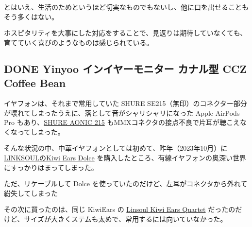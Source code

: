 \documentclass[11pt]{article}
\begin{document}
とはいえ、生活のためというほど切実なものでもないし、他に口を出せることもそう多くはない。

ホスピタリティを大事にした対応をすることで、見返りは期待していなくても、育てていく喜びのようなものは感じられている。
\subsection{{\bfseries\sffamily DONE} Yinyoo インイヤーモニター カナル型 CCZ Coffee Bean}
\label{sec:org388a10c}
イヤフォンは、それまで常用していた SHURE SE215（無印）のコネクター部分が壊れてしまったうえに、落として音がシャリシャリになった Apple AirPods Pro もあり、\href{https://www.amazon.co.jp/dp/B09CZHN9VF/ref=sspa\_dk\_detail\_0?pd\_rd\_i=B09CZHN9VF\&pd\_rd\_w=rUZbI\&content-id=amzn1.sym.f293be60-50b7-49bc-95e8-931faf86ed1e\&pf\_rd\_p=f293be60-50b7-49bc-95e8-931faf86ed1e\&pf\_rd\_r=J7R8B10MRFQNY5X13CEZ\&pd\_rd\_wg=mIVsH\&pd\_rd\_r=89b7d26a-db8f-4b66-9e1d-d0d1e9643baf\&s=musical-instruments\&sp\_csd=d2lkZ2V0TmFtZT1zcF9kZXRhaWw\&th=1}{SHURE AONIC 215} もMMXコネクタの接点不良で片耳が聴こえなくなってしまった。

そんな状況の中、中華イヤフォンとしては初めて、昨年（2023年10月）に\href{https://www.amazon.co.jp/1DDダイナミック型HiFiイヤホン-リケーブル可能のデザイン-0-78mm2pinコネクタの採用-バランスな音質表現を持ちハイエンドイヤホン-ミキシング用の中華製イヤホン/dp/B0C39PK494?pd\_rd\_w=BuYlF\&content-id=amzn1.sym.a8cbdd54-57d2-48f2-94b3-7515d6146573\&pf\_rd\_p=a8cbdd54-57d2-48f2-94b3-7515d6146573\&pf\_rd\_r=GH16TVWVRCJ4GN9KA0JJ\&pd\_rd\_wg=rGYXP\&pd\_rd\_r=38b3f7a9-4f01-4a75-86d8-395986f247d3\&pd\_rd\_i=B0C39PK494\&psc=1\&ref\_=pd\_bap\_d\_grid\_rp\_0\_16\_i}{LINKSOULのKiwi Ears Dolce} を購入したところ、有線イヤフォンの奥深い世界にすっかりはまってしまった。

ただ、リケーブルして Dolce を使っていたのだけど、左耳がコネクタから外れて紛失してしまった🥲

その次に買ったのは、同じ KiwiEars の \href{https://www.amazon.co.jp/Linsoul-リケーブル可能のデザイン-0-78mm2pinコネクタの採用-バランスな音質表現を持ちハイエンドイヤホン-ミキシング用の中華製イヤホン/dp/B0C48QLNSQ?pd\_rd\_w=BuYlF\&content-id=amzn1.sym.a8cbdd54-57d2-48f2-94b3-7515d6146573\&pf\_rd\_p=a8cbdd54-57d2-48f2-94b3-7515d6146573\&pf\_rd\_r=GH16TVWVRCJ4GN9KA0JJ\&pd\_rd\_wg=rGYXP\&pd\_rd\_r=38b3f7a9-4f01-4a75-86d8-395986f247d3\&pd\_rd\_i=B0C48QLNSQ\&psc=1\&ref\_=pd\_bap\_d\_grid\_rp\_0\_17\_i}{Linsoul Kiwi Ears Quartet} だったのだけど、サイズが大きくステムも太めで、常用するには向いていなかった。
\end{document}
